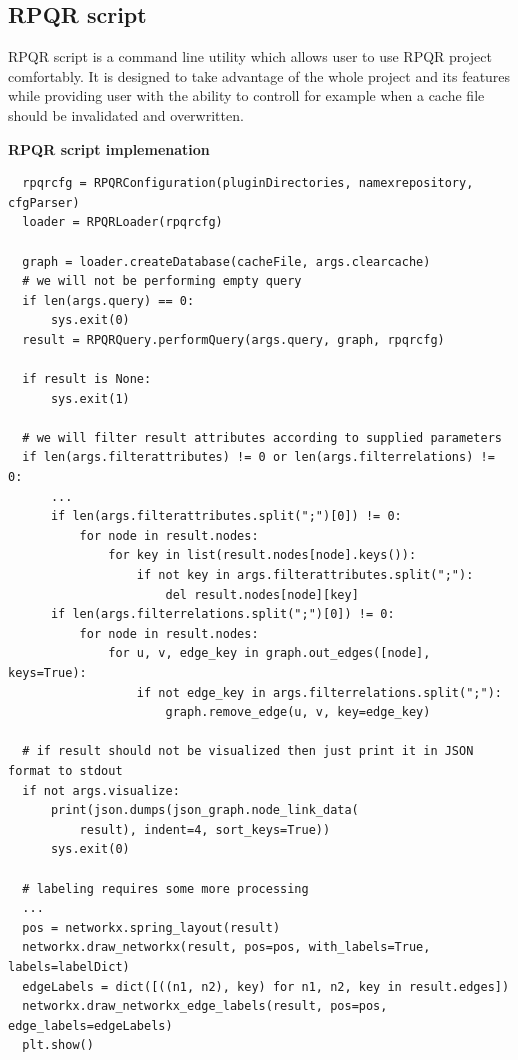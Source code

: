 \newpage

\subsection*{RPQR script}
RPQR script is a command line utility which allows user to use RPQR project comfortably. It is designed
to take advantage of the whole project and its features while providing user with the ability to
controll for example when a cache file should be invalidated and overwritten.

\textbf{RPQR script implemenation}

\begin{lstlisting}
  rpqrcfg = RPQRConfiguration(pluginDirectories, namexrepository, cfgParser)
  loader = RPQRLoader(rpqrcfg)

  graph = loader.createDatabase(cacheFile, args.clearcache)
  # we will not be performing empty query
  if len(args.query) == 0:
      sys.exit(0)
  result = RPQRQuery.performQuery(args.query, graph, rpqrcfg)

  if result is None:
      sys.exit(1)

  # we will filter result attributes according to supplied parameters
  if len(args.filterattributes) != 0 or len(args.filterrelations) != 0:
      ...
      if len(args.filterattributes.split(";")[0]) != 0:
          for node in result.nodes:
              for key in list(result.nodes[node].keys()):
                  if not key in args.filterattributes.split(";"):
                      del result.nodes[node][key]
      if len(args.filterrelations.split(";")[0]) != 0:
          for node in result.nodes:
              for u, v, edge_key in graph.out_edges([node], keys=True):
                  if not edge_key in args.filterrelations.split(";"):
                      graph.remove_edge(u, v, key=edge_key)

  # if result should not be visualized then just print it in JSON format to stdout
  if not args.visualize:
      print(json.dumps(json_graph.node_link_data(
          result), indent=4, sort_keys=True))
      sys.exit(0)

  # labeling requires some more processing
  ...
  pos = networkx.spring_layout(result)
  networkx.draw_networkx(result, pos=pos, with_labels=True, labels=labelDict)
  edgeLabels = dict([((n1, n2), key) for n1, n2, key in result.edges])
  networkx.draw_networkx_edge_labels(result, pos=pos, edge_labels=edgeLabels)
  plt.show()
\end{lstlisting}

